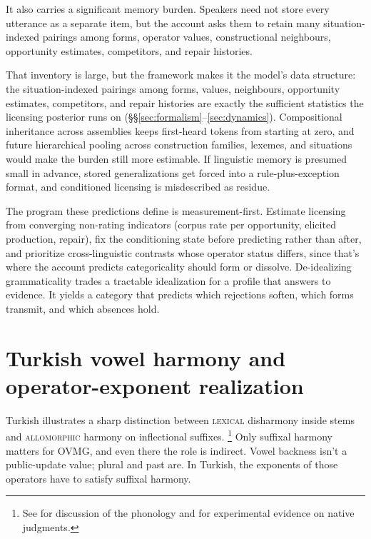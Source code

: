 \documentclass[12pt,letterpaper]{article}
\newcommand{\term}[1]{\textsc{#1}}
\begin{document}
It also carries a significant memory burden. Speakers need not store every utterance as a separate item, but the account asks them to retain many situation-indexed pairings among forms, operator values, constructional neighbours, opportunity estimates, competitors, and repair histories.

That inventory is large, but the framework makes it the model's data structure: the situation-indexed pairings among forms, values, neighbours, opportunity estimates, competitors, and repair histories are exactly the sufficient statistics the licensing posterior runs on (\S\S\ref{sec:formalism}--\ref{sec:dynamics}). Compositional inheritance across assemblies keeps first-heard tokens from starting at zero, and future hierarchical pooling across construction families, lexemes, and situations would make the burden still more estimable. If linguistic memory is presumed small in advance, stored generalizations get forced into a rule-plus-exception format, and conditioned licensing is misdescribed as residue.

The program these predictions define is measurement-first. Estimate licensing from converging non-rating indicators (corpus rate per opportunity, elicited production, repair), fix the conditioning state before predicting rather than after, and prioritize cross-linguistic contrasts whose operator status differs, since that's where the account predicts categoricality should form or dissolve. De-idealizing grammaticality trades a tractable idealization for a profile that answers to evidence. It yields a category that predicts which rejections soften, which forms transmit, and which absences hold.

\newpage
\appendix

\section{Turkish vowel harmony and operator-exponent realization}
\label{app:turkish-harmony}

Turkish illustrates a sharp distinction between \term{lexical} disharmony inside stems and
\term{allomorphic} harmony on inflectional suffixes.%
\footnote{See \autocite{Sezer1981,KabakVogel2001} for discussion of the phonology and \autocite{Arik2015} for experimental evidence on native judgments.}
Only suffixal harmony matters for OVMG, and even there the role is indirect.
Vowel backness isn't a public-update value; plural and past are. In Turkish,
the exponents of those operators have to satisfy suffixal harmony.
\end{document}
